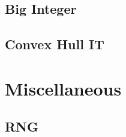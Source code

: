 \subsection{Big Integer}
\raggedbottom
\hrulefill
\subsection{Convex Hull IT}
\raggedbottom
\hrulefill

\section{Miscellaneous}
\subsection{RNG}
\raggedbottom
\hrulefill

